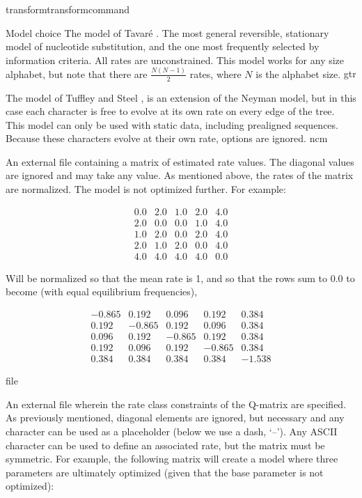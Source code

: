 \begin{command}{transform}{transformcommand}
\begin{arguments}
\begin {argumentgroup} {Model choice}
{The model of Tavar\'{e} \cite{tavare1986}. The most general
reversible, stationary model of nucleotide substitution,
and the one most frequently selected by information
criteria. All rates are unconstrained. This
model works for any size alphabet, but note that there
are $\frac{N (N-1)}{2}$ rates, where $N$ is the alphabet
size.}
{gtr}

{The model of Tuffley and Steel \cite{tuffleyandsteel1998}, is an 
extension of the Neyman model, but in this case each character is 
free to evolve at its own rate on every edge of the tree. This 
model can only be used with static data, including prealigned sequences. 
Because these characters evolve at their own rate,  
options are ignored.}
{ncm}

{An external file containing a matrix of estimated rate
values. The diagonal values are ignored and may take any
value. As mentioned above, the rates of the matrix are
normalized. The model is not optimized further. For example:

\begin{equation*}
\begin{array}{ccccc}
0.0 & 2.0 & 1.0 & 2.0 & 4.0 \\
2.0 & 0.0 & 0.0 & 1.0 & 4.0 \\
1.0 & 2.0 & 0.0 & 2.0 & 4.0 \\
2.0 & 1.0 & 2.0 & 0.0 & 4.0 \\
4.0 & 4.0 & 4.0 & 4.0 & 0.0
\end{array}
\end{equation*} 

Will be normalized so that the mean rate is 1, and so
that the rows sum to 0.0 to become (with equal equilibrium
frequencies),

\begin{equation*}
\begin{array}{rrrrr}
-0.865 & 0.192 & 0.096 & 0.192 & 0.384 \\
0.192 & -0.865 & 0.192 & 0.096 & 0.384 \\
0.096 & 0.192 & -0.865 & 0.192 & 0.384 \\
0.192 & 0.096 & 0.192 & -0.865 & 0.384 \\
0.384 & 0.384 & 0.384 & 0.384 & -1.538
\end{array}
\end{equation*} }
{file}

{An external file wherein the rate class constraints of
the Q-matrix are specified. As previously mentioned,
diagonal elements are ignored, but necessary and any character can
be used as a placeholder (below we use a dash, `--'). Any
ASCII character can be used to define an associated
rate, but the matrix must be symmetric. For example, the
following matrix will create a model where three
parameters are ultimately optimized (given that the base
parameter is not optimized):

}
\end{argumentgroup}
\end{arguments}
\end{command}
